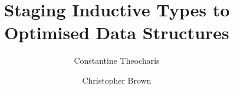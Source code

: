 \begin{frontmatter}
  \title{Staging Inductive Types to Optimised Data Structures}
  \author{Constantine Theocharis}
  \author{Christopher Brown}
  \address{%
    University of St Andrews \\
    St Andrews, Fife, UK
  }


\end{frontmatter}
